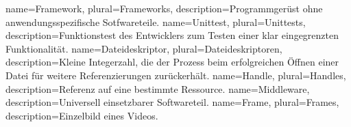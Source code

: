 \makeglossaries 

{
	name={Framework},  
	plural={Frameworks},
	description={Programmgerüst ohne anwendungsspezifische Sotfwareteile. \citep[S. 847]{gumm2011einfuhrung}}
}  
{
	name={Unittest},  
	plural={Unittests},
	description={Funktionstest des Entwicklers zum Testen einer klar eingegrenzten Funktionalität. \citep[S. 3]{hunt2004unit}}
}  
{
	name={Dateideskriptor},  
	plural={Dateideskriptoren},
	description={Kleine Integerzahl, die der Prozess beim erfolgreichen Öffnen einer Datei für weitere Referenzierungen zurückerhält. \citep[S. 25]{beck1994linux}}
}  
{
	name={Handle},  
	plural={Handles},
	description={Referenz auf eine bestimmte Ressource.}
} 
{
	name={Middleware},  
	description={Universell einsetzbarer Softwareteil. \citep[S. 487]{sommerville2011software}}
} 
{
	name={Frame},
	plural={Frames},  
	description={Einzelbild eines Videos.}
} 